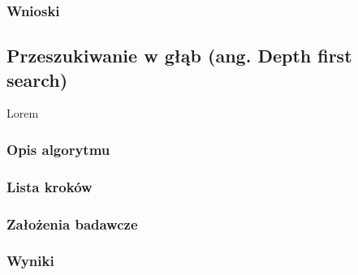 \documentclass{article}
\begin{document}
  \subsubsection{Wnioski}

  \subsection{Przeszukiwanie w głąb (ang. Depth first search)}
  Lorem
  \subsubsection{Opis algorytmu}
  \subsubsection{Lista kroków}
  \subsubsection{Założenia badawcze}
  \subsubsection{Wyniki}
  
  \FloatBarrier
\end{document}
